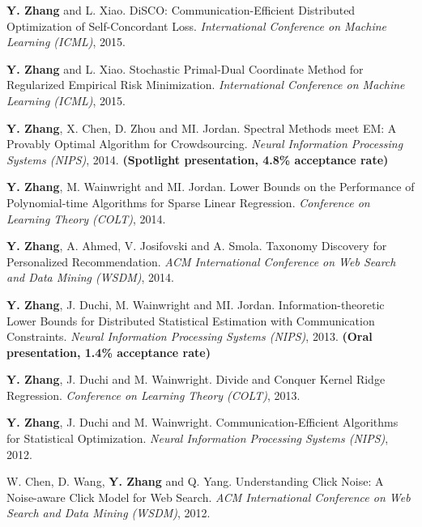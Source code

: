\documentclass{res} %
\begin{document}
\begin{resume}
\begin{enumerate}[label={[C\arabic*]}, ref={C\arabic*}]
\item \textbf{Y. Zhang} and L. Xiao. DiSCO: Communication-Efficient Distributed Optimization of Self-Concordant Loss.
\emph{International Conference on Machine Learning (ICML)}, 2015. \label{communication-icml15}

\item \textbf{Y. Zhang} and L. Xiao. Stochastic Primal-Dual Coordinate Method for Regularized Empirical Risk Minimization.
\emph{International Conference on Machine Learning (ICML)}, 2015.\label{stochastic-icml15}

\item \textbf{Y. Zhang}, X. Chen, D. Zhou and MI. Jordan. Spectral Methods meet EM: A Provably Optimal Algorithm for Crowdsourcing.
\emph{Neural Information Processing Systems (NIPS)}, 2014. \textbf{(Spotlight presentation, 4.8\% acceptance rate)}
\label{spectral-nips14}

\item \textbf{Y. Zhang}, M. Wainwright and MI. Jordan. Lower Bounds on the Performance of Polynomial-time Algorithms for Sparse Linear Regression. \emph{Conference on Learning Theory (COLT)}, 2014. \label{lower-colt14}

\item \textbf{Y. Zhang}, A. Ahmed, V. Josifovski and A. Smola. Taxonomy Discovery for Personalized Recommendation. \emph{ACM International Conference on Web Search and Data Mining (WSDM)}, 2014. \label{taxonomy-wsdm14}

\item \textbf{Y. Zhang}, J. Duchi, M. Wainwright and MI. Jordan. Information-theoretic Lower Bounds for Distributed Statistical Estimation with Communication Constraints.
\emph{Neural Information Processing Systems (NIPS)}, 2013. \textbf{(Oral presentation, 1.4\% acceptance rate)}
\label{information-nips13}

\item  \textbf{Y. Zhang}, J. Duchi and M. Wainwright. Divide and Conquer Kernel Ridge Regression.
\emph{Conference on Learning Theory (COLT)}, 2013. \label{divide-colt13}

\item  \textbf{Y. Zhang}, J. Duchi and M. Wainwright. Communication-Efficient Algorithms for Statistical Optimization.
\emph{Neural Information Processing Systems (NIPS)}, 2012. \label{communication-nips12}

\item  W. Chen, D. Wang, \textbf{Y. Zhang} and Q. Yang. Understanding Click Noise: A Noise-aware Click Model for Web Search.
\emph{ACM International Conference on Web Search and Data Mining (WSDM)}, 2012. \label{understanding-wsdm12}


\end{enumerate}
\end{resume}
\end{document}
